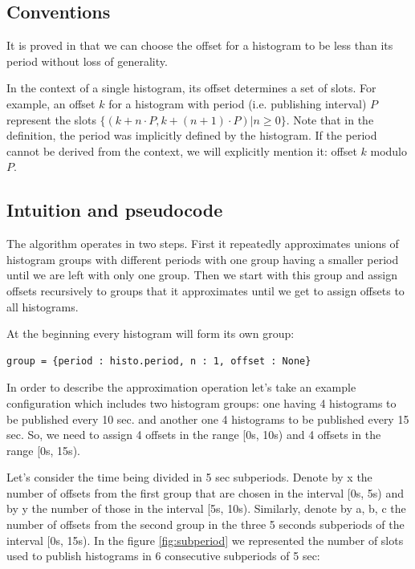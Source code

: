 \subsection{Conventions}

It is proved in \citep{goossens2003scheduling} that we can choose the offset for a histogram to be less than its period without loss of generality. 

In the context of a single histogram, its offset determines a set of slots. For example, an offset $k$ for a histogram with period (i.e. publishing interval) $P$ represent the slots $\{(k+n\cdot P, k+(n+1)\cdot P) | n \geq 0\}$. Note that in the definition, the period was implicitly defined by the histogram. If the period cannot be derived from the context, we will explicitly mention it: offset $k$ modulo $P$.

\subsection{Intuition and pseudocode}

The algorithm operates in two steps. First it repeatedly approximates unions of histogram groups with different periods with one group having a smaller period until we are left with only one group. Then we start with this group and assign offsets recursively to groups that it approximates until we get to assign offsets to all histograms.

At the beginning every histogram will form its own group:
\begin{verbatim}
group = {period : histo.period, n : 1, offset : None}
\end{verbatim}
In order to describe the approximation operation let's take an example configuration which includes two histogram groups: one having 4 histograms to be published every 10 sec. and another one 4 histograms to be published every 15 sec. So, we need to assign 4 offsets in the range [0s, 10s) and 4 offsets in the range [0s, 15s).
 
Let's consider the time being divided in 5 sec subperiods. Denote by x the number of offsets from the first group that are chosen in the interval [0s, 5s) and by y the number of those in the interval [5s, 10s). Similarly, denote by a, b, c the number of offsets from the second group in the three 5 seconds subperiods of the interval [0s, 15s). In the figure \ref{fig:subperiod} we represented the number of slots used to publish histograms in 6 consecutive subperiods of 5 sec:

